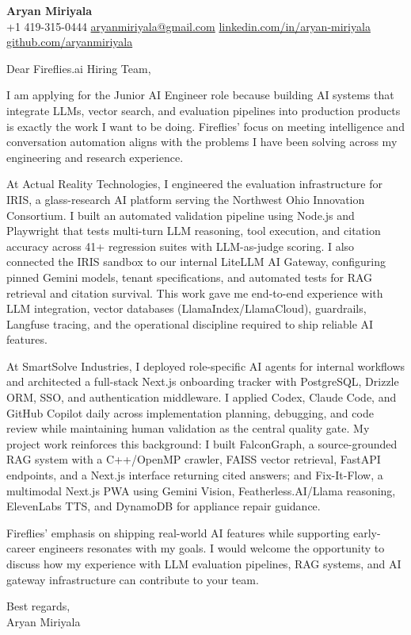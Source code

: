 \documentclass[letterpaper,11pt]{article}
\begin{document}
\begin{center}
    {\Large \textbf{Aryan Miriyala}}\\
    \vspace{2pt}
    +1 419-315-0444 \textbar{} \href{mailto:aryanmiriyala@gmail.com}{aryanmiriyala@gmail.com} \textbar{} \href{https://www.linkedin.com/in/aryan-miriyala-7788a21b6/}{linkedin.com/in/aryan-miriyala} \textbar{} \href{https://github.com/aryanmiriyala}{github.com/aryanmiriyala}
\end{center}

\vspace{10pt}

Dear Fireflies.ai Hiring Team,

I am applying for the Junior AI Engineer role because building AI systems that integrate LLMs, vector search, and evaluation pipelines into production products is exactly the work I want to be doing. Fireflies' focus on meeting intelligence and conversation automation aligns with the problems I have been solving across my engineering and research experience.

At Actual Reality Technologies, I engineered the evaluation infrastructure for IRIS, a glass-research AI platform serving the Northwest Ohio Innovation Consortium. I built an automated validation pipeline using Node.js and Playwright that tests multi-turn LLM reasoning, tool execution, and citation accuracy across 41+ regression suites with LLM-as-judge scoring. I also connected the IRIS sandbox to our internal LiteLLM AI Gateway, configuring pinned Gemini models, tenant specifications, and automated tests for RAG retrieval and citation survival. This work gave me end-to-end experience with LLM integration, vector databases (LlamaIndex/LlamaCloud), guardrails, Langfuse tracing, and the operational discipline required to ship reliable AI features.

At SmartSolve Industries, I deployed role-specific AI agents for internal workflows and architected a full-stack Next.js onboarding tracker with PostgreSQL, Drizzle ORM, SSO, and authentication middleware. I applied Codex, Claude Code, and GitHub Copilot daily across implementation planning, debugging, and code review while maintaining human validation as the central quality gate. My project work reinforces this background: I built FalconGraph, a source-grounded RAG system with a C++/OpenMP crawler, FAISS vector retrieval, FastAPI endpoints, and a Next.js interface returning cited answers; and Fix-It-Flow, a multimodal Next.js PWA using Gemini Vision, Featherless.AI/Llama reasoning, ElevenLabs TTS, and DynamoDB for appliance repair guidance.

Fireflies' emphasis on shipping real-world AI features while supporting early-career engineers resonates with my goals. I would welcome the opportunity to discuss how my experience with LLM evaluation pipelines, RAG systems, and AI gateway infrastructure can contribute to your team.

\vspace{8pt}

Best regards,\\
Aryan Miriyala
\end{document}
